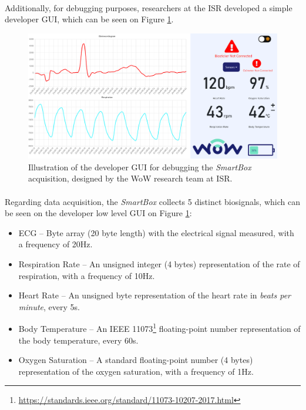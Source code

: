 \paragraph{} Additionally, for debugging purposes, researchers at the \acs{ISR} developed a simple developer \acs{GUI}, which can be seen on Figure \ref{fig:smartbox-gui}.

\begin{figure}[H]
    \centering
    \includegraphics[width=\linewidth]{images/smartbox-gui.png}
    \caption{Illustration of the developer \acf{GUI} for debugging the \textit{SmartBox} acquisition, designed by the \acs{WoW} research team at \acs{ISR}.}
    \label{fig:smartbox-gui}
\end{figure}

\paragraph{} Regarding data acquisition, the \textit{SmartBox} collects 5 distinct biosignals, which can be seen on the developer low level \acs{GUI} on Figure \ref{fig:smartbox-gui}:

\begin{itemize}
    \item \acf{ECG} -- Byte array (20 byte length) with the electrical signal measured, with a frequency of 20Hz.
    \item Respiration Rate -- An unsigned integer (4 bytes) representation of the rate of respiration, with a frequency of 10Hz.
    \item Heart Rate -- An unsigned byte representation of the heart rate in \textit{beats per minute}, every 5s.
    \item Body Temperature -- An IEEE 11073\footnote{\url{https://standards.ieee.org/standard/11073-10207-2017.html}} floating-point number representation of the body temperature, every 60s.
    \item Oxygen Saturation -- A standard floating-point number (4 bytes) representation of the oxygen saturation, with a frequency of 1Hz.
\end{itemize}


